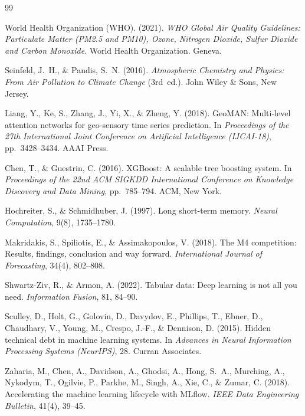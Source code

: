 \documentclass[12pt,a4paper]{report}
\begin{document}
\renewcommand{\bibname}{REFERENCES}
\begin{thebibliography}{99}

World Health Organization (WHO). (2021).
\textit{WHO Global Air Quality Guidelines: Particulate Matter (PM2.5 and PM10), Ozone, Nitrogen Dioxide, Sulfur Dioxide and Carbon Monoxide}.
World Health Organization. Geneva.

Seinfeld, J.~H., \& Pandis, S.~N. (2016).
\textit{Atmospheric Chemistry and Physics: From Air Pollution to Climate Change} (3rd~ed.).
John Wiley \& Sons, New Jersey.

Liang, Y., Ke, S., Zhang, J., Yi, X., \& Zheng, Y. (2018).
GeoMAN: Multi-level attention networks for geo-sensory time series prediction.
In \textit{Proceedings of the 27th International Joint Conference on Artificial Intelligence (IJCAI-18)},
pp.~3428--3434. AAAI Press.

Chen, T., \& Guestrin, C. (2016).
XGBoost: A scalable tree boosting system.
In \textit{Proceedings of the 22nd ACM SIGKDD International Conference on Knowledge Discovery and Data Mining},
pp.~785--794. ACM, New York.

Hochreiter, S., \& Schmidhuber, J. (1997).
Long short-term memory.
\textit{Neural Computation}, 9(8), 1735--1780.

Makridakis, S., Spiliotis, E., \& Assimakopoulos, V. (2018).
The M4 competition: Results, findings, conclusion and way forward.
\textit{International Journal of Forecasting}, 34(4), 802--808.

Shwartz-Ziv, R., \& Armon, A. (2022).
Tabular data: Deep learning is not all you need.
\textit{Information Fusion}, 81, 84--90.

Sculley, D., Holt, G., Golovin, D., Davydov, E., Phillips, T., Ebner, D.,
Chaudhary, V., Young, M., Crespo, J.-F., \& Dennison, D. (2015).
Hidden technical debt in machine learning systems.
In \textit{Advances in Neural Information Processing Systems (NeurIPS)}, 28.
Curran Associates.

Zaharia, M., Chen, A., Davidson, A., Ghodsi, A., Hong, S.~A., Murching, A.,
Nykodym, T., Ogilvie, P., Parkhe, M., Singh, A., Xie, C., \& Zumar, C. (2018).
Accelerating the machine learning lifecycle with MLflow.
\textit{IEEE Data Engineering Bulletin}, 41(4), 39--45.


\end{thebibliography}
\end{document}
